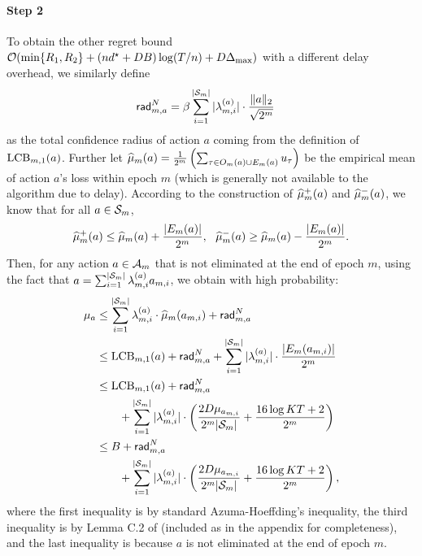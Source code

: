 \paragraph{Step 2}
To obtain the other regret bound $\mathcal{O}(\min\{R_1,R_2\}+(nd^\star+DB)\log(T/n)+D\Delta_{\max})$ with a different delay overhead, we similarly define
\begin{align*}
    \mathsf{rad}_{m,a}^{N} &= \beta\sum_{i=1}^{|{\mathcal{S}}_m|}|\lambda_{m,i}^{(a)}|\cdot \frac{\|a\|_2}{\sqrt{2^m}}
\end{align*}
as the total confidence radius of action $a$ coming from the definition of ${\operatorname{LCB}}_{m,1}(a)$. 
Further let $\widehat{\mu}_m(a) = \frac{1}{2^m}\left(\sum_{\tau\in O_m(a)\cup E_m(a)}u_{\tau}\right)$ be the empirical mean of action $a$'s loss within epoch $m$ (which is generally not available to the algorithm due to delay). According to the construction of $\widehat{\mu}_m^{+}(a)$ and $\widehat{\mu}_m^{-}(a)$, we know that for all $a\in{\mathcal{S}}_m$,
\begin{align*}
    \widehat{\mu}_m^{+}(a)\leq \widehat{\mu}_m(a) + \frac{|E_m(a)|}{2^m},~~\widehat{\mu}_m^{-}(a)\geq \widehat{\mu}_m(a) - \frac{|E_m(a)|}{2^m}.
\end{align*}
Then, for any action $a\in{\mathcal{A}}_m$ that is not eliminated at the end of epoch $m$, using the fact that $a=\sum_{i=1}^{|{\mathcal{S}}_m|}\lambda_{m,i}^{(a)}a_{m,i}$, we obtain with high probability:
\begin{align}
    \mu_a &\leq \sum_{i=1}^{|{\mathcal{S}}_m|}\lambda_{m,i}^{(a)}\cdot \widehat{\mu}_{m}(a_{m,i}) + \mathsf{rad}_{m,a}^{N} \nonumber\\
    &\leq {\operatorname{LCB}}_{m,1}(a) + \mathsf{rad}_{m,a}^{N}+\sum_{i=1}^{|{\mathcal{S}}_m|}|\lambda_{m,i}^{(a)}|\cdot \frac{|E_m(a_{m,i})|}{2^m} \nonumber\\
    &\leq {\operatorname{LCB}}_{m,1}(a) +\mathsf{rad}_{m,a}^{N} \nonumber\\
    &\qquad + \sum_{i=1}^{|{\mathcal{S}}_m|}|\lambda_{m,i}^{(a)}|\cdot\left(\frac{2D\mu_{a_{m,i}}}{2^m|{\mathcal{S}}_m|}+\frac{16\log KT +2}{2^m}\right) \\
    &\leq B +\mathsf{rad}_{m,a}^{N} \nonumber\\
    &\qquad + \sum_{i=1}^{|{\mathcal{S}}_m|}|\lambda_{m,i}^{(a)}|\cdot\left(\frac{2D\mu_{a_{m,i}}}{2^m|{\mathcal{S}}_m|}+\frac{16\log KT +2}{2^m}\right),\label{eqn:small-loss}
\end{align}
where the first inequality is by standard Azuma-Hoeffding's inequality, the third inequality is by Lemma C.2 of \citet{schlisselberg2024delay} (included as  in the appendix for completeness), and the last inequality is because $a$ is not eliminated at the end of epoch $m$.

